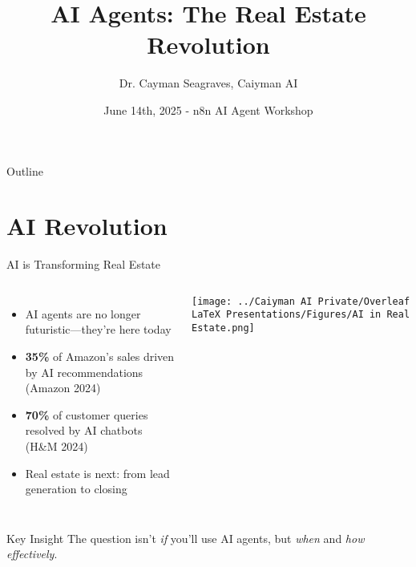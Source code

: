 \documentclass{beamer}
\author{Dr. Cayman Seagraves, Caiyman AI}
\date{June 14th, 2025 - n8n AI Agent Workshop}
\title{AI Agents: The Real Estate Revolution}
\begin{document}
{
\begin{frame}
    \titlepage
\end{frame}
}

\begin{frame}{Outline}
    \tableofcontents
\end{frame}

\section{AI Revolution}

\begin{frame}{AI is Transforming Real Estate}
\small
  \begin{columns}[onlytextwidth]
      \begin{itemize}
        \item AI agents are no longer futuristic—they're here today
        \item \textbf{35\%} of Amazon's sales driven by AI recommendations {\tiny(Amazon 2024)}
        \item \textbf{70\%} of customer queries resolved by AI chatbots {\tiny(H\&M 2024)}
        \item Real estate is next: from lead generation to closing
      \end{itemize}
    
      \centering
      \texttt{[image: ../Caiyman AI Private/Overleaf LaTeX Presentations/Figures/AI in Real Estate.png]}
  \end{columns}

  \vspace{0.3cm}

  \begin{block}{Key Insight}
    The question isn't \emph{if} you'll use AI agents, but \emph{when} and \emph{how effectively}.
  \end{block}
\end{frame}
\end{document}
